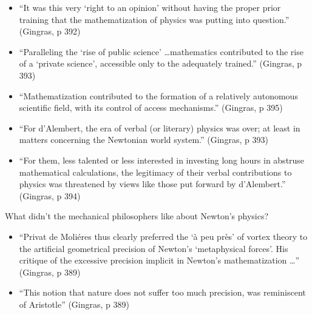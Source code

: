 \documentclass[fleqn]{beamer}
\begin{document}
\begin{frame}

  \begin{itemize}
  \item ``It was this very `right to an opinion' without having the
    proper prior training that the mathematization of physics was
    putting into question.'' (Gingras, p 392)
  \item ``Paralleling the `rise of public science' \dots mathematics
    contributed to the rise of a `private science', accessible only to
    the adequately trained.'' (Gingras, p 393)
  \item ``Mathematization contributed to the formation of a relatively
    autonomous scientific field, with its control of access
    mechanisms.'' (Gingras, p 395)
  \end{itemize}

\end{frame}

\begin{frame}

  \begin{itemize}
  \item ``For d'Alembert, the era of verbal (or literary) physics was
    over; at least in matters concerning the Newtonian world system.''
    (Gingras, p 393)
  \item ``For them, less talented or less interested in investing long
    hours in abstruse mathematical calculations, the legitimacy of
    their verbal contributions to physics was threatened by views like
    those put forward by d'Alembert.'' (Gingras, p 394)
  \end{itemize}

\end{frame}

\begin{frame}{What didn't the mechanical philosophers like about Newton's physics?}

  \begin{itemize}
  \item ``Privat de Moli{\'e}res thus clearly preferred the `\`a peu
    pr\`es' of vortex theory to the artificial geometrical precision
    of Newton's `metaphysical forces'. His critique of the excessive
    precision implicit in Newton's mathematization \dots '' (Gingras,
    p 389)
  \item ``This notion that nature does not suffer too much precision,
    was reminiscent of Aristotle'' (Gingras, p 389)
  \end{itemize}

\end{frame}
\end{document}
